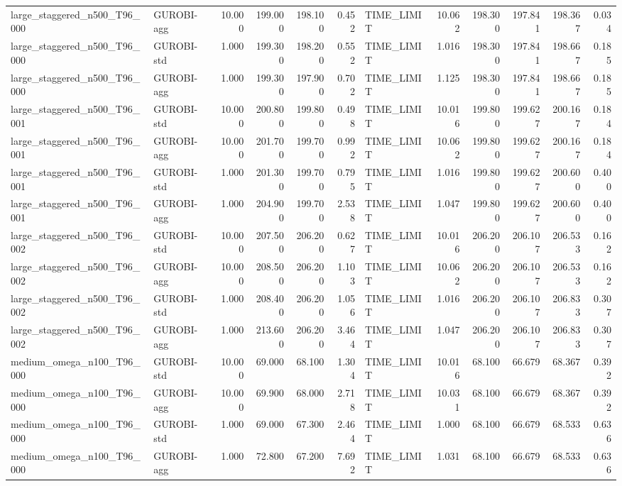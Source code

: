 \begin{table}[htbp]
\begin{tabular}{llrrrrlrrrrr}
large\_staggered\_n500\_T96\_000 & GUROBI-agg & 10.000 & 199.000 & 198.100 & 0.452 & TIME\_LIMIT & 10.062 & 198.300 & 197.841 & 198.367 & 0.034 \\
large\_staggered\_n500\_T96\_000 & GUROBI-std & 1.000 & 199.300 & 198.200 & 0.552 & TIME\_LIMIT & 1.016 & 198.300 & 197.841 & 198.667 & 0.185 \\
large\_staggered\_n500\_T96\_000 & GUROBI-agg & 1.000 & 199.300 & 197.900 & 0.702 & TIME\_LIMIT & 1.125 & 198.300 & 197.841 & 198.667 & 0.185 \\
large\_staggered\_n500\_T96\_001 & GUROBI-std & 10.000 & 200.800 & 199.800 & 0.498 & TIME\_LIMIT & 10.016 & 199.800 & 199.627 & 200.167 & 0.184 \\
large\_staggered\_n500\_T96\_001 & GUROBI-agg & 10.000 & 201.700 & 199.700 & 0.992 & TIME\_LIMIT & 10.062 & 199.800 & 199.627 & 200.167 & 0.184 \\
large\_staggered\_n500\_T96\_001 & GUROBI-std & 1.000 & 201.300 & 199.700 & 0.795 & TIME\_LIMIT & 1.016 & 199.800 & 199.627 & 200.600 & 0.400 \\
large\_staggered\_n500\_T96\_001 & GUROBI-agg & 1.000 & 204.900 & 199.700 & 2.538 & TIME\_LIMIT & 1.047 & 199.800 & 199.627 & 200.600 & 0.400 \\
large\_staggered\_n500\_T96\_002 & GUROBI-std & 10.000 & 207.500 & 206.200 & 0.627 & TIME\_LIMIT & 10.016 & 206.200 & 206.107 & 206.533 & 0.162 \\
large\_staggered\_n500\_T96\_002 & GUROBI-agg & 10.000 & 208.500 & 206.200 & 1.103 & TIME\_LIMIT & 10.062 & 206.200 & 206.107 & 206.533 & 0.162 \\
large\_staggered\_n500\_T96\_002 & GUROBI-std & 1.000 & 208.400 & 206.200 & 1.056 & TIME\_LIMIT & 1.016 & 206.200 & 206.107 & 206.833 & 0.307 \\
large\_staggered\_n500\_T96\_002 & GUROBI-agg & 1.000 & 213.600 & 206.200 & 3.464 & TIME\_LIMIT & 1.047 & 206.200 & 206.107 & 206.833 & 0.307 \\
medium\_omega\_n100\_T96\_000 & GUROBI-std & 10.000 & 69.000 & 68.100 & 1.304 & TIME\_LIMIT & 10.016 & 68.100 & 66.679 & 68.367 & 0.392 \\
medium\_omega\_n100\_T96\_000 & GUROBI-agg & 10.000 & 69.900 & 68.000 & 2.718 & TIME\_LIMIT & 10.031 & 68.100 & 66.679 & 68.367 & 0.392 \\
medium\_omega\_n100\_T96\_000 & GUROBI-std & 1.000 & 69.000 & 67.300 & 2.464 & TIME\_LIMIT & 1.000 & 68.100 & 66.679 & 68.533 & 0.636 \\
medium\_omega\_n100\_T96\_000 & GUROBI-agg & 1.000 & 72.800 & 67.200 & 7.692 & TIME\_LIMIT & 1.031 & 68.100 & 66.679 & 68.533 & 0.636 \\

\end{tabular}
\end{table}

